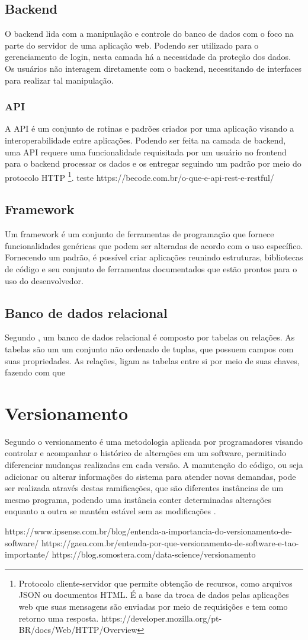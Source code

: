 \subsection{Backend}
O backend lida com a manipulação e controle do banco de dados com o foco na parte do servidor de uma aplicação web. Podendo ser utilizado para o gerenciamento de login, nesta camada há a necessidade da proteção dos dados. Os usuários não interagem diretamente com o backend, necessitando de interfaces para realizar tal manipulação.

\subsubsection{API}
A API é um conjunto de rotinas e padrões criados por uma aplicação visando a interoperabilidade entre aplicações. Podendo ser feita na camada de backend, uma API requere uma funcionalidade requisitada por um usuário no frontend para o backend processar os dados e os entregar seguindo um padrão por meio do protocolo HTTP
\footnote{Protocolo cliente-servidor que permite obtenção de recursos, como arquivos JSON ou documentos HTML. É a base da troca de dados pelas aplicações web que suas mensagens são enviadas por meio de requisições e tem como retorno uma resposta.\cite{HTTP}  https://developer.mozilla.org/pt-BR/docs/Web/HTTP/Overview}.
teste
https://becode.com.br/o-que-e-api-rest-e-restful/

\subsection{Framework}
Um framework é um conjunto de ferramentas de programação que fornece funcionalidades genéricas que podem ser alteradas de acordo com o uso específico. Fornecendo um padrão, é possível criar aplicações reunindo estruturas, bibliotecas de código e seu conjunto de ferramentas documentados que estão prontos para o uso do desenvolvedor.

\subsection{Banco de dados relacional}
Segundo , um banco de dados relacional é composto por tabelas ou relações. As tabelas são um um conjunto não ordenado de tuplas, que possuem campos com suas propriedades. As relações, ligam as tabelas entre si por meio de suas chaves, fazendo com que 
\section{Versionamento}
Segundo  o versionamento é uma metodologia aplicada por programadores visando controlar e acompanhar o histórico de alterações em um software, permitindo diferenciar mudanças realizadas em cada versão. A manutenção do código, ou seja adicionar ou alterar informações do sistema para atender novas demandas, pode ser realizada através destas ramificações, que são diferentes instâncias de um mesmo programa, podendo uma instância conter determinadas alterações enquanto a outra se mantém estável sem as modificações \cite{SOMOSTERA}.


https://www.ipsense.com.br/blog/entenda-a-importancia-do-versionamento-de-software/
https://gaea.com.br/entenda-por-que-versionamento-de-software-e-tao-importante/
https://blog.somostera.com/data-science/versionamento

